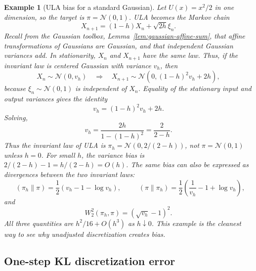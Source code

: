 \documentclass[10pt,a4paper]{amsart}
\numberwithin{equation}{section}
\newtheorem*{example}{Example}
\DeclareMathOperator{\KL}{D_{\mathsf{KL}}}
\newcommand{\normal}[2]{\mathcal{N}\!\left(#1,#2\right)}
\begin{document}
\begin{example}[ULA bias for a standard Gaussian]
Let $U(x)=x^2/2$ in one dimension, so the target is $\pi=\normal{0}{1}$.
ULA becomes the Markov chain
\[
    X_{n+1}=(1-h)X_n+\sqrt{2h}\xi_n.
\]
Recall from the Gaussian toolbox, Lemma~\ref{lem:gaussian-affine-sum}, that
affine transformations of Gaussians are Gaussian, and that independent Gaussian
variances add.  In stationarity, $X_n$ and $X_{n+1}$ have the same law.  Thus,
if the invariant law is centered Gaussian with variance $v_h$, then
\[
    X_n\sim\normal{0}{v_h}
    \quad\Longrightarrow\quad
    X_{n+1}\sim
    \normal{0}{(1-h)^2v_h+2h},
\]
because $\xi_n\sim\normal{0}{1}$ is independent of $X_n$.  Equality of the
stationary input and output variances gives the identity
\[
    v_h=(1-h)^2v_h+2h.
\]
Solving,
\[
    v_h=\frac{2h}{1-(1-h)^2}=\frac{2}{2-h}.
\]
Thus the invariant law of ULA is $\pi_h=\normal{0}{2/(2-h)}$, not $\pi=\normal{0}{1}$ unless $h=0$.  For small $h$, the variance bias is $2/(2-h)-1=h/(2-h)=O(h)$.  The same bias can also be expressed as divergences between the two invariant laws:
\[
    \KL(\pi_h\|\pi)
    =
    \frac12\left(v_h-1-\log v_h\right),
    \qquad
    \KL(\pi\|\pi_h)
    =
    \frac12\left(\frac1{v_h}-1+\log v_h\right),
\]
and
\[
    W_2^2(\pi_h,\pi)=(\sqrt{v_h}-1)^2.
\]
All three quantities are $h^2/16+O(h^3)$ as $h\downarrow0$.  This example is
the cleanest way to see why unadjusted discretization creates bias.
\end{example}

\subsection{One-step KL discretization error}
\end{document}
